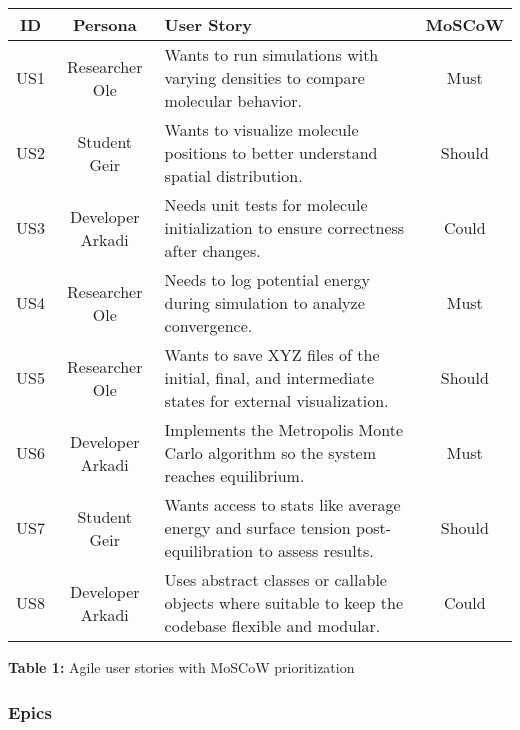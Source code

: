 \documentclass{article}
\begin{document}
\begin{center}
\renewcommand{\arraystretch}{1.4}
\begin{tabularx}{\textwidth}{|c|c|X|c|}
\hline
\textbf{ID} & \textbf{Persona} & \textbf{User Story} & \textbf{MoSCoW} \\
\hline
US1 & Researcher Ole & Wants to run simulations with varying densities to compare molecular behavior. & Must \\
US2 & Student Geir & Wants to visualize molecule positions to better understand spatial distribution. & Should \\
US3 & Developer Arkadi & Needs unit tests for molecule initialization to ensure correctness after changes. & Could \\
US4 & Researcher Ole & Needs to log potential energy during simulation to analyze convergence. & Must \\
US5 & Researcher Ole & Wants to save XYZ files of the initial, final, and intermediate states for external visualization. & Should \\
US6 & Developer Arkadi & Implements the Metropolis Monte Carlo algorithm so the system reaches equilibrium. & Must \\
US7 & Student Geir & Wants access to stats like average energy and surface tension post-equilibration to assess results. & Should \\
US8 & Developer Arkadi & Uses abstract classes or callable objects where suitable to keep the codebase flexible and modular. & Could \\
\hline
\end{tabularx}

\vspace{0.5em}
\textbf{Table 1:} Agile user stories with MoSCoW prioritization
\end{center}


\subsubsection*{Epics}
\end{document}
